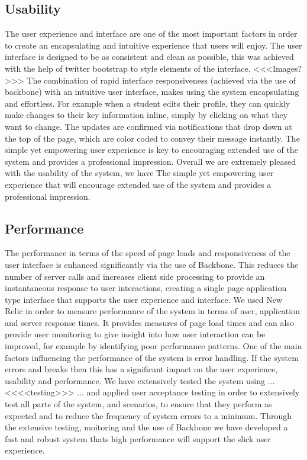 \subsection{Usability}
	The user experience and interface are one of the most important factors in order to create an encapsulating and intuitive experience that users will enjoy. The user interface is designed to be as consistent and clean as possible, this was achieved with the help of twitter bootstrap to style elements of the interface.
		<<<Images?>>>
	The combination of rapid interface responsiveness (achieved via the use of backbone) with an intuitive user interface, makes using the system encapsulating and effortless. For example when a student edits their profile, they can quickly make changes to their key information inline, simply by clicking on what they want to change. The updates are confirmed via notifications that drop down at the top of the page, which are color coded to convey their message instantly. The simple yet empowering user experience is key to encouraging extended use of the system and provides a professional impression. Overall we are extremely pleased with the usability of the system, we have The simple yet empowering user experience that will encourage extended use of the system and provides a professional impression. 
\subsection{Performance}
	The performance in terms of the speed of page loads and responsiveness of the user interface is enhanced significantly via the use of Backbone. This reduces the number of server calls and increases client side processing to provide an instantaneous response to user interactions, creating a single page application type interface that supports the user experience and interface. We used New Relic in order to measure performance of the system in terms of user, application and server response times. It provides measures of page load times and can also provide user monitoring to give insight into how user interaction can be improved, for example by identifying poor performance patterns.
	One of the main factors influencing the performance of the system is error handling. If the system errors and breaks then this has a significant impact on the user experience, usability and performance. We have extensively tested the system using ... <<<<testing>>> ... and applied user acceptance testing in order to extensively test all parts of the system, and scenarios, to ensure that they perform as expected and to reduce the frequency of system errors to a minimum.
	Through the extensive testing, moitoring and the use of Backbone we have developed a fast and robust system thats high performance will support the slick user experience.
